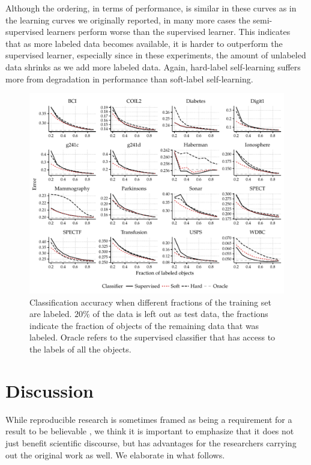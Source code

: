 \documentclass[runningheads,a4paper]{llncs}\usepackage[]{graphicx}\usepackage[]{color}
\makeatletter
\def\maxwidth{ %
  \ifdim\Gin@nat@width>\linewidth
    \linewidth
  \else
    \Gin@nat@width
  \fi
}
\newenvironment{knitrout}{}{} %
\makeatother
\begin{document}
Although the ordering, in terms of performance, is similar in these curves as in the learning curves we originally reported, in many more cases the semi-supervised learners perform worse than the supervised learner. This indicates that as more labeled data becomes available, it is harder to outperform the supervised learner, especially since in these experiments, the amount of unlabeled data shrinks as we add more labeled data. Again, hard-label self-learning suffers more from degradation in performance than soft-label self-learning.

\begin{knitrout}
\color{fgcolor}\begin{figure}
\includegraphics[width=\maxwidth]{figure/learningcurves-frac-1} \caption[Classification accuracy when different fractions of the training set are labeled]{Classification accuracy when different fractions of the training set are labeled. $20\%$ of the data is left out as test data, the fractions indicate the fraction of objects of the remaining data that was labeled. Oracle refers to the supervised classifier that has access to the labels of all the objects.}\label{fig:learningcurves-frac}
\end{figure}


\end{knitrout}

\section{Discussion}
While reproducible research is sometimes framed as being a requirement for a result to be believable \cite{Goodman2016a,Donoho2009}, we think it is important to emphasize that it does not just benefit scientific discourse, but has advantages for the researchers carrying out the original work as well. We elaborate in what follows.
\end{document}
